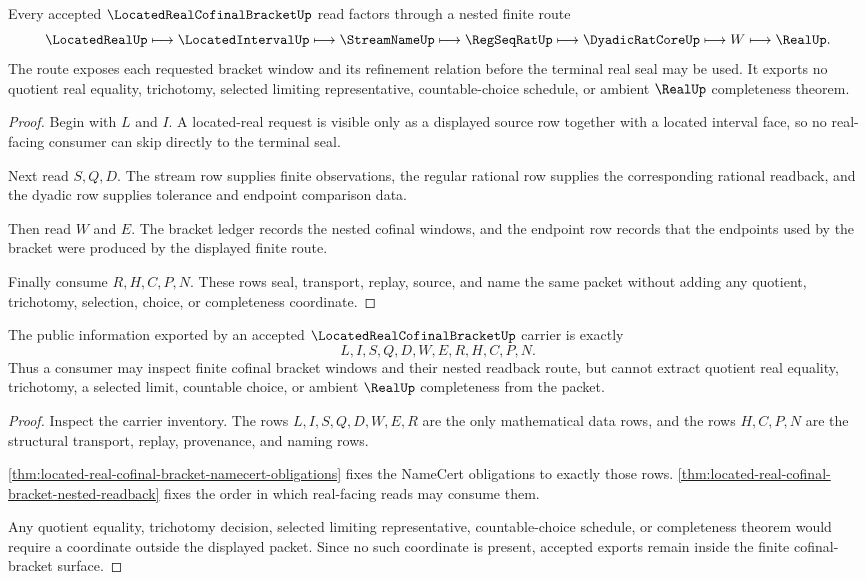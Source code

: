 \begin{theorem}
\label{thm:located-real-cofinal-bracket-nested-readback}
Every accepted $\LocatedRealCofinalBracketUp$ read factors through a nested finite route
$$
\LocatedRealUp \longmapsto \LocatedIntervalUp \longmapsto
\StreamNameUp \longmapsto \RegSeqRatUp \longmapsto
\DyadicRatCoreUp \longmapsto W \longmapsto \RealUp .
$$
The route exposes each requested bracket window and its refinement relation before the terminal real seal may be used. It exports no quotient real equality, trichotomy, selected limiting representative, countable-choice schedule, or ambient $\RealUp$ completeness theorem.
\end{theorem}
\begin{proof}
Begin with $L$ and $I$. A located-real request is visible only as a displayed source row together with a located interval face, so no real-facing consumer can skip directly to the terminal seal.

Next read $S,Q,D$. The stream row supplies finite observations, the regular rational row supplies the corresponding rational readback, and the dyadic row supplies tolerance and endpoint comparison data.

Then read $W$ and $E$. The bracket ledger records the nested cofinal windows, and the endpoint row records that the endpoints used by the bracket were produced by the displayed finite route.

Finally consume $R,H,C,P,N$. These rows seal, transport, replay, source, and name the same packet without adding any quotient, trichotomy, selection, choice, or completeness coordinate.
\end{proof}

\begin{theorem}
\label{thm:located-real-cofinal-bracket-nonescape}
The public information exported by an accepted $\LocatedRealCofinalBracketUp$ carrier is exactly
$$
L,I,S,Q,D,W,E,R,H,C,P,N .
$$
Thus a consumer may inspect finite cofinal bracket windows and their nested readback route, but cannot extract quotient real equality, trichotomy, a selected limit, countable choice, or ambient $\RealUp$ completeness from the packet.
\end{theorem}
\begin{proof}
Inspect the carrier inventory. The rows $L,I,S,Q,D,W,E,R$ are the only mathematical data rows, and the rows $H,C,P,N$ are the structural transport, replay, provenance, and naming rows.

\autoref{thm:located-real-cofinal-bracket-namecert-obligations} fixes the NameCert obligations to exactly those rows. \autoref{thm:located-real-cofinal-bracket-nested-readback} fixes the order in which real-facing reads may consume them.

Any quotient equality, trichotomy decision, selected limiting representative, countable-choice schedule, or completeness theorem would require a coordinate outside the displayed packet. Since no such coordinate is present, accepted exports remain inside the finite cofinal-bracket surface.
\end{proof}

